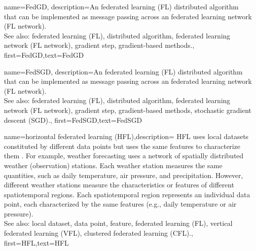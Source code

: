{name={FedGD},
	description={An federated learning (FL) distributed algorithm that 
		can be implemented as message passing across an federated learning network (FL network). 
		\\ 
		See also: federated learning (FL), distributed algorithm, federated learning network (FL network), gradient step, gradient-based methods.},
	first={FedGD},text={FedGD}
} 

{name={FedSGD},
	description={An federated learning (FL) distributed algorithm that 
		can be implemented as message passing across an federated learning network (FL network). 
		\\ 
		See also: federated learning (FL), distributed algorithm, federated learning network (FL network), gradient step, gradient-based methods, stochastic gradient descent (SGD).},
	first={FedSGD},text={FedSGD}
} 

{name={horizontal federated learning (HFL)},description=
	{HFL uses local datasets constituted by different
	   data points but uses the same features to characterize them \cite{HFLChapter2020}.
		For example, weather forecasting uses a network of spatially distributed
		weather (observation) stations. Each weather station measures the
		same quantities, such as daily temperature, air pressure, and precipitation.
		However, different weather stations measure the characteristics or
		features of different spatiotemporal regions. Each spatiotemporal region 
		represents an individual data point, each characterized by the same features 
		(e.g., daily temperature or air pressure).\\
		See also: local dataset, data point, feature, federated learning (FL), vertical federated learning (VFL), clustered federated learning (CFL).},
	first={HFL},text={HFL}
} 

